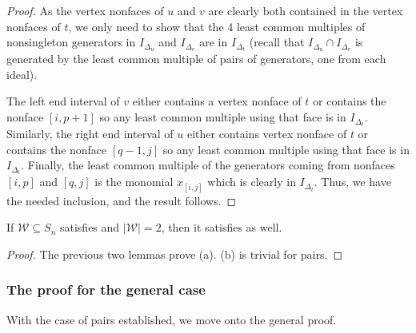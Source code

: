 \begin{proof}
    As the vertex nonfaces of $u$ and $v$ are clearly both contained in the vertex nonfaces of $t$, we only need to show that the 4 least common multiples of nonsingleton generators in $I_{\Delta_u}$ and $I_{\Delta_v}$ are in $I_{\Delta_t}$ (recall that $I_{\Delta_u}\cap I_{\Delta_v}$ is generated by the least common multiple of pairs of generators, one from each ideal).

    The left end interval of $v$ either contains a vertex nonface of $t$ or contains the nonface $[i,p+1]$ so any least common multiple using that face is in $I_{\Delta_t}.$
    Similarly, the right end interval of $u$ either contains vertex nonface of $t$ or contains the nonface $[q-1,j]$ so any least common multiple using that face is in $I_{\Delta_t}$.
    Finally, the least common multiple of the generators coming from nonfaces $[i,p]$ and $[q,j]$ is the monomial $x_{[i,j]}$ which is clearly in $I_{\Delta_t}$.
    Thus, we have the needed inclusion, and the result follows.
\end{proof}

\begin{lemma}
\label{lem:2 implies 3 for pairs}
    If $\mathcal{W}\subseteq S_n$ satisfies  and $|\mathcal{W}|=2$, then it satisfies  as well.
\end{lemma}

\begin{proof}
    The previous two lemmas prove (a). (b) is trivial for pairs.
\end{proof}

\subsubsection{The proof for the general case}
With the case of pairs established, we move onto the general proof.


